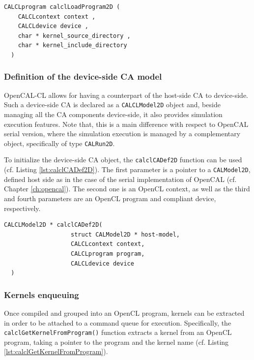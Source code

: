 \begin{lstlisting}[float,floatplacement=H, label=lst:calclLoadProgram, caption={The calclLoadProgramLib function. It loads and compiles kernels by returning an OpenCL program.}, numbers=none]
  CALCLprogram calclLoadProgram2D (
    CALCLcontext context ,
    CALCLdevice device ,
    char * kernel_source_directory ,
    char * kernel_include_directory
  )
\end{lstlisting}

\subsubsection{Definition of the device-side CA model}

OpenCAL-CL allows for having a counterpart of the host-side CA to
device-side. Such a device-side CA is declared as a
\verb'CALCLModel2D' object and, beside managing all the CA components
device-side, it also provides simulation execution features. Note
that, this is a main difference with respect to OpenCAL serial
version, where the simulation execution is managed by a complementary
object, specifically of type \verb'CALRun2D'.

To initialize the device-side CA object, the \verb'calclCADef2D'
function can be used (cf. Listing \ref{lst:calclCADef2D}). The first
parameter is a pointer to a \verb'CALModel2D', defined host side as in
the case of the serial implementation of OpenCAL (cf. Chapter
\ref{ch:opencal}). The second one is an OpenCL context, as well as the
third and fourth parameters are an OpenCL program and compliant
device, respectively.


\begin{lstlisting}[float,floatplacement=H, label=lst:calclCADef2D, caption=The calclCADef2D data structure., numbers=none]
  CALCLModel2D * calclCADef2D(
                   struct CALModel2D * host-model,
                   CALCLcontext context,
                   CALCLprogram program,
                   CALCLdevice device
  )
\end{lstlisting}


\subsubsection{Kernels enqueuing}

Once compiled and grouped into an OpenCL program, kernels can be
extracted in order to be attached to a command queue for
execution. Specifically, the \verb'calclGetKernelFromProgram()'
function extracts a kernel from an OpenCL program, taking a pointer to
the program and the kernel name (cf. Listing
\ref{lst:calclGetKernelFromProgram}).

